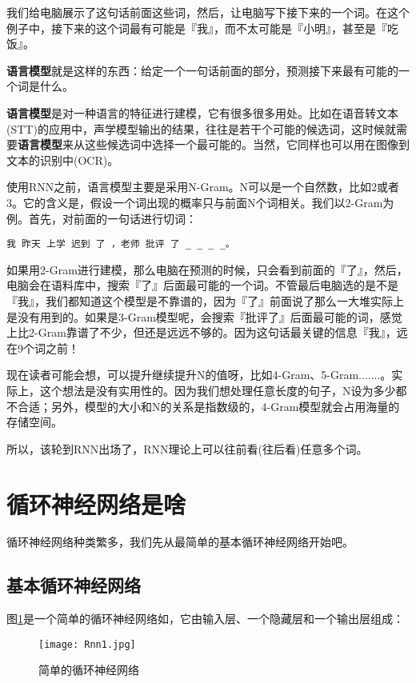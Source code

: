 我们给电脑展示了这句话前面这些词，然后，让电脑写下接下来的一个词。在这个例子中，接下来的这个词最有可能是『我』，而不太可能是『小明』，甚至是『吃饭』。

\textbf{语言模型}就是这样的东西：给定一个一句话前面的部分，预测接下来最有可能的一个词是什么。

\textbf{语言模型}是对一种语言的特征进行建模，它有很多很多用处。比如在语音转文本(STT)的应用中，声学模型输出的结果，往往是若干个可能的候选词，这时候就需要\textbf{语言模型}来从这些候选词中选择一个最可能的。当然，它同样也可以用在图像到文本的识别中(OCR)。

使用RNN之前，语言模型主要是采用N-Gram。N可以是一个自然数，比如2或者3。它的含义是，假设一个词出现的概率只与前面N个词相关。我们以2-Gram为例。首先，对前面的一句话进行切词：
\begin{lstlisting}[numbers=none]
    我 昨天 上学 迟到 了 ，老师 批评 了 _ _ _ _。
\end{lstlisting}


如果用2-Gram进行建模，那么电脑在预测的时候，只会看到前面的『了』，然后，电脑会在语料库中，搜索『了』后面最可能的一个词。不管最后电脑选的是不是『我』，我们都知道这个模型是不靠谱的，因为『了』前面说了那么一大堆实际上是没有用到的。如果是3-Gram模型呢，会搜索『批评了』后面最可能的词，感觉上比2-Gram靠谱了不少，但还是远远不够的。因为这句话最关键的信息『我』，远在9个词之前！

现在读者可能会想，可以提升继续提升N的值呀，比如4-Gram、5-Gram.......。实际上，这个想法是没有实用性的。因为我们想处理任意长度的句子，N设为多少都不合适；另外，模型的大小和N的关系是指数级的，4-Gram模型就会占用海量的存储空间。

所以，该轮到RNN出场了，RNN理论上可以往前看(往后看)任意多个词。

\section{循环神经网络是啥}\label{Rnn:2}

循环神经网络种类繁多，我们先从最简单的基本循环神经网络开始吧。

\subsection{基本循环神经网络}\label{Rnn:3}

图\ref{fig:Rnn1}是一个简单的循环神经网络如，它由输入层、一个隐藏层和一个输出层组成：

\begin{figure}[!h]
	\centering
	\texttt{[image: Rnn1.jpg]}
	\caption{简单的循环神经网络}
	\label{fig:Rnn1}
\end{figure}

